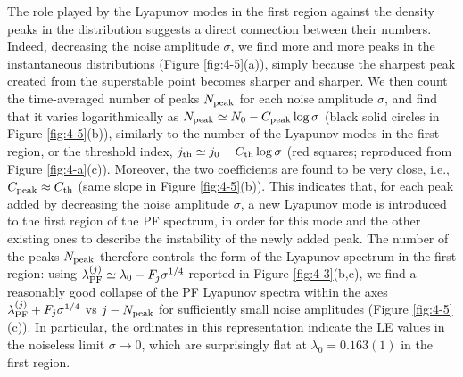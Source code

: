 \documentclass[12pt]{iopart}
\begin{document}
The role played by the Lyapunov modes in the first region
 against the density peaks in the distribution
suggests a direct connection between their numbers.
Indeed, decreasing the noise amplitude $\sigma$,
 we find more and more peaks in the instantaneous distributions
 (Figure \ref{fig:4-5}(a)), simply because
 the sharpest peak created from the superstable point
 becomes sharper and sharper.
We then count
 the time-averaged number of peaks $N_{\rm peak}$
 for each noise amplitude $\sigma$,
 and find that it varies logarithmically
 as $N_{\rm peak} \simeq N_0 - C_{\rm peak}\log\sigma$
 (black solid circles in Figure \ref{fig:4-5}(b)),
 similarly to the number of the Lyapunov modes in the first region,
 or the threshold index, $j_{\rm th} \simeq j_0 - C_{\rm th}\log\sigma$
 (red squares; reproduced from Figure \ref{fig:4-a}(c)).
Moreover, the two coefficients are found to be very close,
 i.e., $C_{\rm peak} \approx C_{\rm th}$
 (same slope in Figure \ref{fig:4-5}(b)).
This indicates that,
 for each peak added by decreasing the noise amplitude $\sigma$,
 a new Lyapunov mode is introduced to the first region of the PF spectrum,
 in order for this mode and the other existing ones
 to describe the instability of the newly added peak.
The number of the peaks $N_{\rm peak}$ therefore controls
 the form of the Lyapunov spectrum in the first region:
 using $\lambda_{\rm PF}^{(j)} \simeq \lambda_0 - F_j \sigma^{1/4}$
 reported in Figure \ref{fig:4-3}(b,c),
 we find a reasonably good collapse of the PF Lyapunov spectra
 within the axes $\lambda_{\rm PF}^{(j)} + F_j \sigma^{1/4}$
 vs $j - N_{\rm peak}$ for sufficiently small noise amplitudes
 (Figure \ref{fig:4-5}(c)).
In particular,
 the ordinates in this representation indicate
 the LE values in the noiseless limit $\sigma \to 0$,
 which are surprisingly flat at $\lambda_0 = 0.163(1)$
 in the first region.
\end{document}
